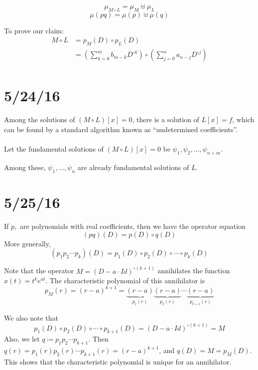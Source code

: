 \documentclass[12pt]{article}
\begin{document}
\begin{theorem}
\[ \mu_{M \circ L} = \mu_M \uplus \mu_L \]
\[ \mu(pq) = \mu(p) \uplus \mu(q) \]
\end{theorem}

To prove our claim:
\[
\begin{aligned}
  M \circ L &= p_M(D) \circ p_L(D) \\
  &= \left(\sum_{k=0}^m b_{m-k}D^{\circ k}\right)\circ \left(\sum_{j=0}^n a_{n-j}D^{\circ j}\right) \\
\end{aligned}
\]

\section{5/24/16}
Among the solutions of $(M \circ L)[x] = 0$, there is a solution of $L[x] = f$, which can be found by a standard algorithm known as ``undetermined coefficients''. \\ \\
Let the fundamental solutions of $(M \circ L)[x] = 0$ be $\psi_1, \psi_2, \dots, \psi_{n+m}$.

Among these, $\psi_1,\dots,\psi_n$ are already fundamental solutions of $L$.

\section{5/25/16}


\begin{theorem}
If $p,$ are polynomials with real coefficients, then we have the operator equation
\[ (pq)(D) = p(D) \circ q(D) \]
More generally,
\[ (p_1p_2\cdots p_k)(D) = p_1(D) \circ p_2(D) \circ \cdots \circ p_k(D) \]
\end{theorem}

Note that the operator $M = (D - a\cdot Id)^{\circ (k+1)}$ annihilates the function $x(t) = t^ke^{at}$. The characteristic polynomial of this annihilator is \[ p_M(r) = (r-a)^{k+1} = \underbrace{(r-a)}_{p_1(r)}\underbrace{(r-a)}_{p_2(r)}\cdots\underbrace{(r-a)}_{p_{k+1}(r)} \]

We also note that \[ p_1(D) \circ p_2(D) \circ \cdots \circ p_{k+1}(D) = (D-a\cdot Id)^{\circ (k+1)} = M \]
Also, we let $q \coloneqq p_1p_2\cdots p_{k+1}$. Then $q(r) = p_1(r)p_2(r)\cdots p_{k+1}(r) = (r-a)^{k+1}$, and $q(D) = M = p_M(D)$. This shows that the characteristic polynomial is unique for an annihilator. %
\end{document}

